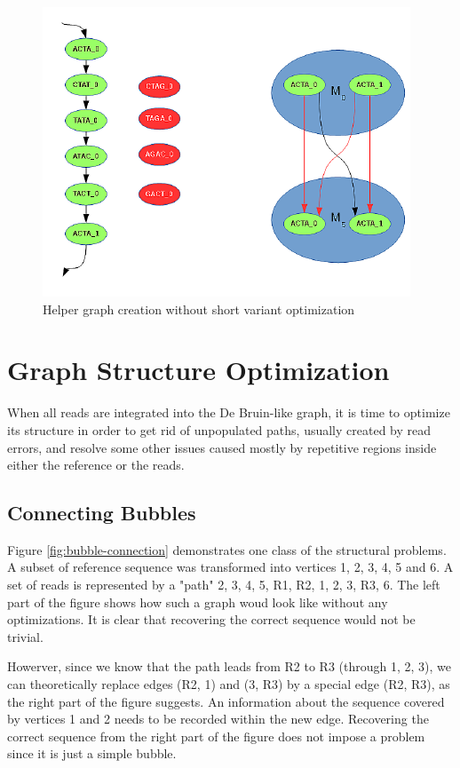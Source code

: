 \begin{figure}[h]
	\centering
	\includegraphics{img/helper-graph.pdf}
	\caption{Helper graph creation without short variant optimization}
	\label{fig:helper-graph}
\end{figure}

\section{Graph Structure Optimization}
\label{sec:graph-structure-optimization}

When all reads are integrated into the De Bruin-like graph, it is time to optimize its structure in order to get rid of unpopulated paths, usually created by read errors, and resolve some other issues caused mostly by repetitive regions inside either the reference or the reads.

\subsection{Connecting Bubbles}
\label{subsec:connecting-bubbles}

Figure \ref{fig:bubble-connection} demonstrates one class of the structural problems. A subset of reference sequence was transformed into vertices 1, 2, 3, 4, 5 and 6. A set of reads is represented by a "path" 2, 3, 4, 5, R1, R2, 1, 2, 3, R3, 6.  The left part of the figure shows how such a graph woud look like without any optimizations. It is clear that recovering the correct sequence would not be trivial. 

Howerver, since we know that the path leads from R2 to R3 (through 1, 2, 3), we can theoretically replace edges (R2, 1) and (3, R3) by a special edge (R2, R3), as the right part of the figure suggests. An information about the sequence covered by vertices 1 and 2 needs to be recorded within the new edge. Recovering the correct sequence from the right part of the figure does not impose a problem since it is just a simple bubble. 

